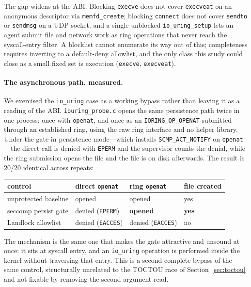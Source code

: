 \documentclass[11pt]{article}
\begin{document}
The gap widens at the ABI. Blocking \texttt{execve} does not cover \texttt{execveat} on an anonymous
descriptor via \texttt{memfd\_create}; blocking \texttt{connect} does not cover \texttt{sendto} or
\texttt{sendmsg} on a UDP socket; and a single unblocked \texttt{io\_uring\_setup} lets an agent submit
file and network work as ring operations that never reach the syscall-entry filter.
A blocklist cannot enumerate its way out of this; completeness requires inverting to a default-deny
allowlist, and the only class this study could close as a small fixed set is execution
(\texttt{execve}, \texttt{execveat}).

\paragraph{The asynchronous path, measured.} We exercised the \texttt{io\_uring} case as a working
bypass rather than leaving it as a reading of the ABI. \texttt{iouring\_probe.c} opens the same
persistence path twice in one process: once with \texttt{openat}, and once as an
\texttt{IORING\_OP\_OPENAT} submitted through an established ring, using the raw ring interface and no
helper library. Under the gate in persistence mode---which installs
\texttt{SCMP\_ACT\_NOTIFY} on \texttt{openat}---the direct call is denied with \texttt{EPERM} and the
supervisor counts the denial, while the ring submission opens the file and the file is on disk
afterwards. The result is 20/20 identical across repeats:

\begin{center}
\begin{tabular}{llll}
\toprule
control & direct \texttt{openat} & ring \texttt{openat} & file created \\
\midrule
unprotected baseline & opened & opened & yes \\
seccomp persist gate & denied (\texttt{EPERM}) & \textbf{opened} & \textbf{yes} \\
Landlock allowlist & denied (\texttt{EACCES}) & denied (\texttt{EACCES}) & no \\
\bottomrule
\end{tabular}
\end{center}

The mechanism is the same one that makes the gate attractive and unsound at once: it sits at syscall
entry, and an \texttt{io\_uring} operation is performed inside the kernel without traversing that
entry. This is a second complete bypass of the same control, structurally unrelated to the TOCTOU race
of Section~\ref{sec:toctou} and not fixable by removing the second argument read.
\end{document}
